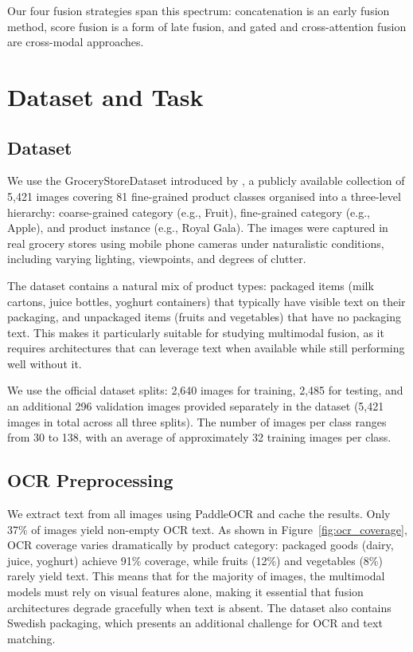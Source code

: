 \documentclass[10pt,twocolumn]{article}
\begin{document}
Our four fusion strategies span this spectrum: concatenation is an early fusion method, score fusion is a form of late fusion, and gated and cross-attention fusion are cross-modal approaches.

\section{Dataset and Task}
\label{sec:dataset}

\subsection{Dataset}

We use the GroceryStoreDataset introduced by \citet{klasson2019hierarchical}, a publicly available collection of 5,421 images covering 81 fine-grained product classes organised into a three-level hierarchy: coarse-grained category (e.g., Fruit), fine-grained category (e.g., Apple), and product instance (e.g., Royal Gala). The images were captured in real grocery stores using mobile phone cameras under naturalistic conditions, including varying lighting, viewpoints, and degrees of clutter.

The dataset contains a natural mix of product types: packaged items (milk cartons, juice bottles, yoghurt containers) that typically have visible text on their packaging, and unpackaged items (fruits and vegetables) that have no packaging text. This makes it particularly suitable for studying multimodal fusion, as it requires architectures that can leverage text when available while still performing well without it.

We use the official dataset splits: 2,640 images for training, 2,485 for testing, and an additional 296 validation images provided separately in the dataset (5,421 images in total across all three splits). The number of images per class ranges from 30 to 138, with an average of approximately 32 training images per class.

\subsection{OCR Preprocessing}

We extract text from all images using PaddleOCR and cache the results. Only 37\% of images yield non-empty OCR text. As shown in Figure~\ref{fig:ocr_coverage}, OCR coverage varies dramatically by product category: packaged goods (dairy, juice, yoghurt) achieve 91\% coverage, while fruits (12\%) and vegetables (8\%) rarely yield text. This means that for the majority of images, the multimodal models must rely on visual features alone, making it essential that fusion architectures degrade gracefully when text is absent. The dataset also contains Swedish packaging, which presents an additional challenge for OCR and text matching.
\end{document}
